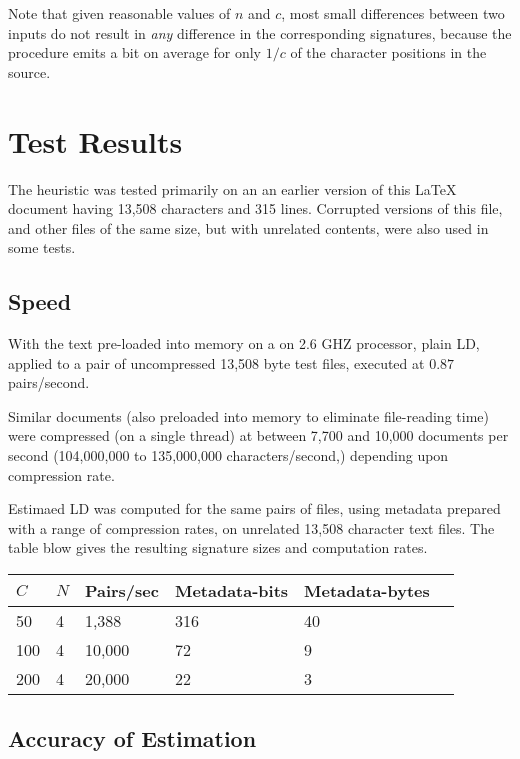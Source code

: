 \documentclass[html]{article}    %
\begin{document}
Note that given reasonable values of $n$ and $c$, most small differences 
between two inputs do not result in {\em any} difference in the 
corresponding signatures, because the procedure emits a bit on average 
for only $1/c$ of the character positions in the source.

\section{Test Results}
The heuristic was tested primarily on an an earlier version of this \LaTeX \,
document having 13,508 characters and 315 lines. 
Corrupted versions of this file, and other files of the same size, but with
unrelated contents, were also used in some tests.

\subsection{Speed}
With the text pre-loaded into memory on a on 2.6 GHZ processor, plain LD,
applied to a pair of uncompressed 13,508 byte test files, executed at $0.87$
pairs/second.

Similar documents (also preloaded into memory to eliminate file-reading time)
were compressed (on a single thread) at between 7,700 and 10,000 documents per
second (104,000,000 to 135,000,000 characters/second,) depending upon compression rate.

Estimaed LD was computed for the same pairs of files, using metadata prepared
with a range of compression rates, on unrelated 13,508 character text files.
The table blow gives the resulting signature sizes and computation rates.

\vspace {10 mm}
\begin {tabular} {|l|l|l|l|l|r|} \hline \hline
 $C$ 	& $N$ & Pairs/sec & Metadata-bits & Metadata-bytes \\ \hline
 \hline
 
 50 	& 4  & 1,388		& 316 	& 40 \\ \hline
 
 100 	& 4  & 10,000 		& 72 	& 9  \\ \hline
 
 200 	& 4  & 20,000 		& 22  	& 3  \\ \hline
 
\end {tabular} 

\subsection{Accuracy of Estimation}
\end{document}

